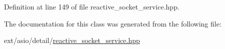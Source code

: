 Definition at line 149 of file reactive\+\_\+socket\+\_\+service.\+hpp.



The documentation for this class was generated from the following file\+:\begin{DoxyCompactItemize}
\item 
ext/asio/detail/\hyperlink{reactive__socket__service_8hpp}{reactive\+\_\+socket\+\_\+service.\+hpp}\end{DoxyCompactItemize}
